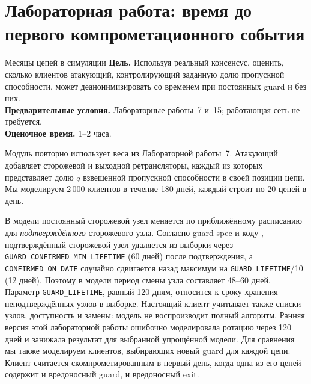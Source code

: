 {\renewcommand{\sectionmark}[1]{}%
\section{Лабораторная работа: время до первого компрометационного события}\label{sec:lab-ricerca}}

\begin{laboratorio}[19]{Месяцы цепей в симуляции}
\textbf{Цель.} Используя реальный консенсус, оценить, сколько клиентов атакующий, контролирующий заданную долю пропускной способности, может деанонимизировать со временем при постоянных guard и без них.\\
\textbf{Предварительные условия.} Лабораторные работы~7 и~15; работающая сеть не требуется.\\
\textbf{Оценочное время.} 1--2 часа.
\end{laboratorio}

Модуль  повторно использует веса из Лабораторной работы~7. Атакующий добавляет сторожевой и выходной ретрансляторы, каждый из которых представляет долю $q$ взвешенной пропускной способности в своей позиции цепи. Мы моделируем 2\,000 клиентов в течение 180 дней, каждый строит по 20 цепей в день.

В модели постоянный сторожевой узел меняется по приближённому расписанию для \emph{подтверждённого} сторожевого узла. Согласно guard-spec и коду , подтверждённый сторожевой узел удаляется из выборки через \texttt{GUARD\_CONFIRMED\_MIN\_LIFETIME} (60 дней) после подтверждения, а \texttt{CONFIRMED\_ON\_DATE} случайно сдвигается назад максимум на \texttt{GUARD\_LIFETIME}/10 (12 дней). Поэтому в модели период смены узла составляет 48--60 дней. Параметр \texttt{GUARD\_LIFETIME}, равный 120 дням, относится к сроку хранения неподтверждённых узлов в выборке. Настоящий клиент учитывает также списки узлов, доступность и замены: модель не воспроизводит полный алгоритм. Ранняя версия этой лабораторной работы ошибочно моделировала ротацию через 120 дней и занижала результат для выбранной упрощённой модели. Для сравнения мы также моделируем клиентов, выбирающих новый guard для каждой цепи. Клиент считается скомпрометированным в первый день, когда одна из его цепей содержит и вредоносный guard, и вредоносный exit.


